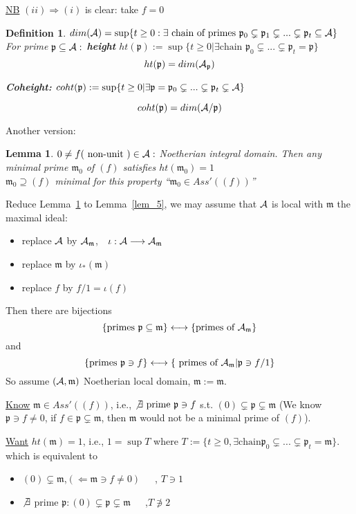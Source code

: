 \documentclass[11pt]{article}
\newtheorem{lemma}[thm]{Lemma}
\newtheorem{dfn}[thm]{Definition}
\newcommand{\scm}{{\mathfrak m}}
\newcommand{\scp}{{\mathfrak p}}
\newcommand{\cala}{{\cal A}}
\newcommand{\Lrta}{\Longrightarrow}
\newcommand{\lrta}{\longrightarrow}
\newcommand{\llrta}{\longleftrightarrow}
\newcommand{\Llta}{\Longleftarrow}
\begin{document}
\underline{NB} $(ii)\Lrta(i)$ is clear: take $f=0$


\begin{dfn}
$dim(\cala)=\sup \{t\geq 0:\exists \text{ chain of primes $\scp_0\subsetneq \scp_1\subsetneq ...\subsetneq \scp_t\subseteq \cala$}\}$\\

For prime $\scp\subseteq \cala:$ \textbf{ height }$ht(\scp):=\sup \{t\geq 0|\exists\text{chain $\scp_0\subsetneq ...\subsetneq \scp_t=\scp$}\}$
$$
ht(\scp)=dim(\cala_\scp)
$$

\textbf{Coheight:} $coht(\scp):=\sup\{t\geq 0|\exists \scp=\scp_0\subsetneq ...\subsetneq \scp_t\subsetneq \cala\}$

$$
coht(\scp)=dim(\cala/\scp)
$$
\end{dfn}
 
Another version:
\begin{lemma}\label{lem_5'}
$0\neq f(\text{ non-unit })\in\cala:$ Noetherian integral domain. Then any minimal prime $\scm_0$ of $(f)$ satisfies $ht(\scm_0)= 1$\\
$\scm_0\supseteq (f)$ minimal for this property ``$\scm_0\in Ass'((f))$''
\end{lemma}

Reduce Lemma~\ref{lem_5'} to Lemma~\ref{lem_5}, we may assume that $\cala$ is local with $\scm$ the maximal ideal:
\begin{itemize}
\item replace $\cala$ by $\cala_{\scm}$,\ \  $\iota:\cala\lrta \cala_{\scm}$
\item replace $\scm$ by $\iota_*(\scm)$
\item replace $f$ by $f/1=\iota(f)$
\end{itemize}

Then there are bijections 
$$
\{\text{primes $\scp\subseteq \scm$}\}\llrta \text{\{primes of $\cala_{\scm}$\}}
$$
and  
$$
\{\text{primes $\scp\ni f$}\} \llrta\{\text{ primes of }\cala_{\scm}|\scp\ni f/1\}
$$
So assume $(\cala,\scm)$ Noetherian local domain, $\scm:=\scm$.

\underline{Know} $\scm\in Ass'((f))$, i.e., $\not \exists \text{ prime }\scp\ni f$ s.t. $(0)\subsetneq \scp\subsetneq \scm$ (We know $\scp\ni f\neq 0$, if $f\in\scp\subsetneq\scm$, then $\scm$ would not be a minimal prime of $(f)$).

\underline{Want} $ht(\scm)=1$, i.e.,
$1=\sup T$ where $T:=\{t\geq 0,\exists \text{chain} \scp_0\subsetneq ...\subsetneq \scp_t=\scm\}$. which is equivalent to 
\begin{itemize}
\item $(0)\subsetneq \scm$,$(\Llta \scm\ni f\neq 0)$\ \ \ , $T\ni 1$
\item $\not \exists$ prime $\scp:(0)\subsetneq \scp\subsetneq\scm$\ \ \ ,$T\not\ni 2$
\end{itemize}
\end{document}
